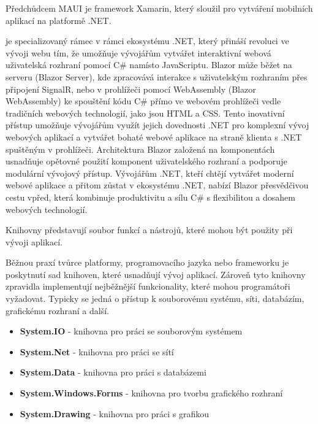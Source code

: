Předchůdcem MAUI je framework Xamarin, který sloužil pro vytváření mobilních aplikací na platformě .NET.


je specializovaný rámec v rámci ekosystému .NET, který přináší revoluci ve vývoji webu tím, že umožňuje vývojářům vytvářet interaktivní webová uživatelská rozhraní pomocí C\# namísto JavaScriptu. Blazor může běžet na serveru (Blazor Server), kde zpracovává interakce s uživatelským rozhraním přes připojení SignalR, nebo v prohlížeči pomocí WebAssembly (Blazor WebAssembly) ke spouštění kódu C\# přímo ve webovém prohlížeči vedle tradičních webových technologií, jako jsou HTML a CSS. Tento inovativní přístup umožňuje vývojářům využít jejich dovednosti .NET pro komplexní vývoj webových aplikací a vytvářet bohaté webové aplikace na straně klienta s .NET spuštěným v prohlížeči. Architektura Blazor založená na komponentách usnadňuje opětovné použití komponent uživatelského rozhraní a podporuje modulární vývojový přístup. Vývojářům .NET, kteří chtějí vytvářet moderní webové aplikace a přitom zůstat v ekosystému .NET, nabízí Blazor přesvědčivou cestu vpřed, která kombinuje produktivitu a sílu C\# s flexibilitou a dosahem webových technologií.


Knihovny představují soubor funkcí a nástrojů, které mohou být použity při vývoji aplikací. 


Běžnou praxí tvůrce platformy, programovacího jazyka nebo frameworku je poskytnutí sad knihoven, které usnadňují vývoj aplikací. Zároveň tyto knihovny zpravidla implementují nejběžnější funkcionality, které mohou programátoři vyžadovat. Typicky se jedná o přístup k souborovému systému, síti, databázím, grafickému rozhraní a další.

\begin{itemize}
    \item \textbf{System.IO} - knihovna pro práci se souborovým systémem
    \item \textbf{System.Net} - knihovna pro práci se sítí
    \item \textbf{System.Data} - knihovna pro práci s databázemi
    \item \textbf{System.Windows.Forms} - knihovna pro tvorbu grafického rozhraní
    \item \textbf{System.Drawing} - knihovna pro práci s grafikou
\end{itemize}

